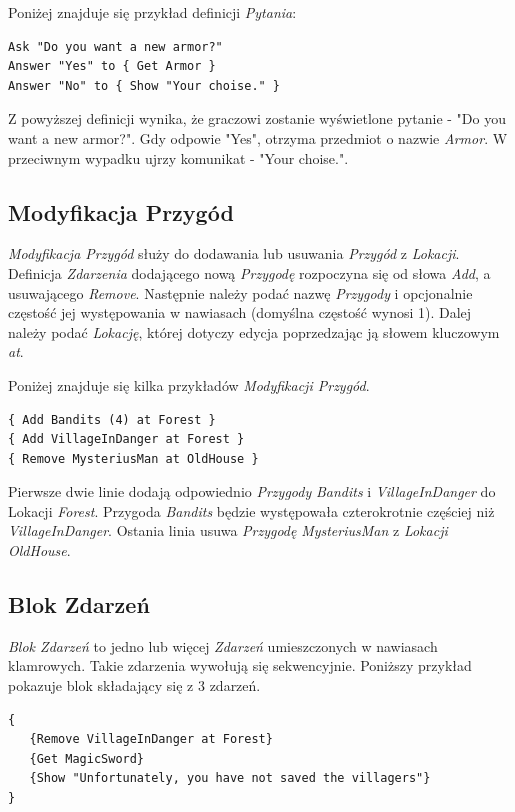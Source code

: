 \documentclass[openright]{xmgr}
\begin{document}
Poniżej znajduje się przykład definicji \textit{Pytania}:
\begin{verbatim}
Ask "Do you want a new armor?"
Answer "Yes" to { Get Armor }
Answer "No" to { Show "Your choise." }
\end{verbatim}

Z powyższej definicji wynika, że graczowi zostanie wyświetlone pytanie - "Do you want a new armor?". Gdy odpowie "Yes", otrzyma przedmiot o nazwie \textit{Armor}. W przeciwnym wypadku ujrzy komunikat - "Your choise.".

\subsection{Modyfikacja Przygód}
\textit{Modyfikacja Przygód} służy do dodawania lub usuwania \textit{Przygód} z \textit{Lokacji}. Definicja \textit{Zdarzenia} dodającego nową \textit{Przygodę} rozpoczyna się od słowa \textit{Add}, a usuwającego \textit{Remove}. Następnie należy podać nazwę \textit{Przygody} i opcjonalnie częstość jej występowania w nawiasach (domyślna częstość wynosi 1). Dalej należy podać \textit{Lokację}, której dotyczy edycja poprzedzając ją słowem kluczowym \textit{at}.

Poniżej znajduje się kilka przykładów \textit{Modyfikacji Przygód}. 
\begin{verbatim}
{ Add Bandits (4) at Forest }
{ Add VillageInDanger at Forest }
{ Remove MysteriusMan at OldHouse }
\end{verbatim}
Pierwsze dwie linie dodają odpowiednio \textit{Przygody} \textit{Bandits} i \textit{VillageInDanger} do Lokacji \textit{Forest}. Przygoda \textit{Bandits} będzie występowała czterokrotnie częściej niż \textit{VillageInDanger}. Ostania linia usuwa \textit{Przygodę} \textit{MysteriusMan} z \textit{Lokacji} \textit{OldHouse}.

\subsection*{Blok Zdarzeń}
\textit{Blok Zdarzeń } to jedno lub więcej \textit{Zdarzeń} umieszczonych w nawiasach klamrowych. Takie zdarzenia wywołują się sekwencyjnie.
Poniższy przykład pokazuje blok składający się z 3 zdarzeń.
\begin{verbatim}
{
   {Remove VillageInDanger at Forest}
   {Get MagicSword}
   {Show "Unfortunately, you have not saved the villagers"}
}
\end{verbatim}
\end{document}
